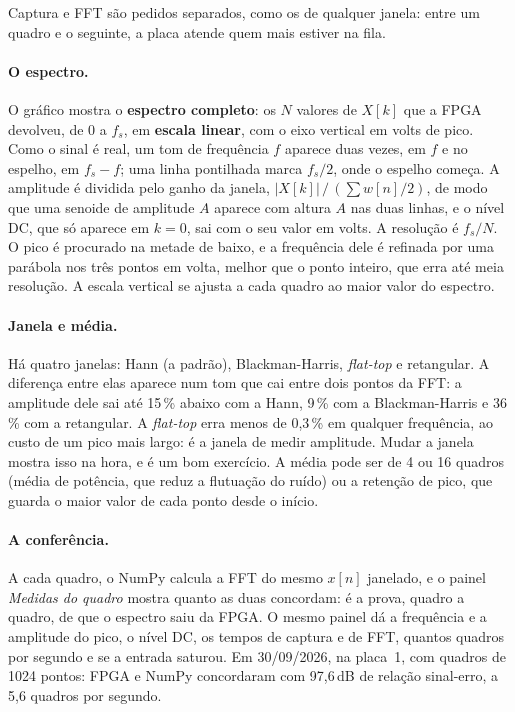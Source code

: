 Captura e FFT são pedidos separados, como os de qualquer janela: entre um
quadro e o seguinte, a placa atende quem mais estiver na fila.

\paragraph{O espectro.} O gráfico mostra o \textbf{espectro completo}: os
\(N\) valores de \(X[k]\) que a FPGA devolveu, de 0 a \(f_s\), em
\textbf{escala linear}, com o eixo vertical em volts de pico. Como o sinal é
real, um tom de frequência \(f\) aparece duas vezes, em \(f\) e no espelho, em
\(f_s - f\); uma linha pontilhada marca \(f_s/2\), onde o espelho começa. A
amplitude é dividida pelo ganho da janela, \(|X[k]| \,/\, (\sum w[n]/2)\), de
modo que uma senoide de amplitude \(A\) aparece com altura \(A\) nas duas
linhas, e o nível DC, que só aparece em \(k = 0\), sai com o seu valor em
volts. A resolução é \(f_s/N\). O pico é procurado na metade de baixo, e a
frequência dele é refinada por uma parábola nos três pontos em volta, melhor
que o ponto inteiro, que erra até meia resolução. A escala vertical se ajusta
a cada quadro ao maior valor do espectro.

\paragraph{Janela e média.} Há quatro janelas: Hann (a padrão),
Blackman-Harris, \emph{flat-top} e retangular. A diferença entre elas aparece
num tom que cai entre dois pontos da FFT: a amplitude dele sai até 15\,\%
abaixo com a Hann, 9\,\% com a Blackman-Harris e 36\,\% com a retangular. A
\emph{flat-top} erra menos de 0,3\,\% em qualquer frequência, ao custo de um
pico mais largo: é a janela de medir amplitude. Mudar a janela mostra isso na
hora, e é um bom exercício. A média pode ser de 4 ou 16 quadros (média de
potência, que reduz a flutuação do ruído) ou a retenção de pico, que guarda o
maior valor de cada ponto desde o início.

\paragraph{A conferência.} A cada quadro, o NumPy calcula a FFT do mesmo
\(x[n]\) janelado, e o painel \emph{Medidas do quadro} mostra quanto as duas
concordam: é a prova, quadro a quadro, de que o espectro saiu da FPGA. O mesmo
painel dá a frequência e a amplitude do pico, o nível DC, os tempos de captura
e de FFT, quantos quadros por segundo e se a entrada saturou. Em 30/09/2026,
na placa~1, com quadros de 1024 pontos: FPGA e NumPy concordaram com
97,6\,dB de relação sinal-erro, a 5,6 quadros por segundo.

